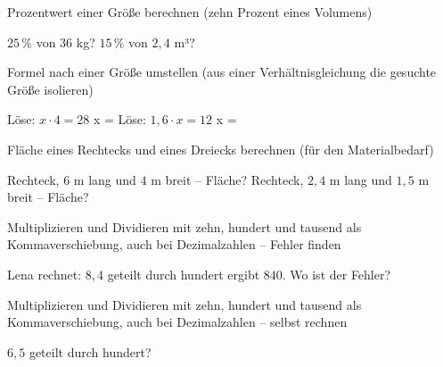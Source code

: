 \begin{aufgabe}{Prozentwert einer Größe berechnen (zehn Prozent eines Volumens)}
\begin{teile}
\teil $25\,\%$ von $36$ kg? \leerfeld[kg]
\teil $15\,\%$ von $2{,}4$ m³? \leerfeld[m³]
\end{teile}
\end{aufgabe}

\begin{aufgabe}{Formel nach einer Größe umstellen (aus einer Verhältnisgleichung die gesuchte Größe isolieren)}
\begin{teile}
\teil Löse: $x \cdot 4 = 28$ x = \leerfeld
\teil Löse: $1{,}6 \cdot x = 12$ x = \leerfeld
\end{teile}
\end{aufgabe}

\begin{aufgabe}{Fläche eines Rechtecks und eines Dreiecks berechnen (für den Materialbedarf)}
\begin{teile}
\teil Rechteck, $6$ m lang und $4$ m breit – Fläche? \leerfeld[m²]
\teil Rechteck, $2{,}4$ m lang und $1{,}5$ m breit – Fläche? \leerfeld[m²]
\end{teile}
\end{aufgabe}

\begin{aufgabe}{Multiplizieren und Dividieren mit zehn, hundert und tausend als Kommaverschiebung, auch bei Dezimalzahlen – Fehler finden}
\begin{teile}
\teil Lena rechnet: $8{,}4$ geteilt durch hundert ergibt $840$. Wo ist der Fehler?
\end{teile}
\end{aufgabe}

\begin{aufgabe}{Multiplizieren und Dividieren mit zehn, hundert und tausend als Kommaverschiebung, auch bei Dezimalzahlen – selbst rechnen}
\begin{teile}
\teil $6{,}5$ geteilt durch hundert? \leerfeld
\end{teile}
\end{aufgabe}

